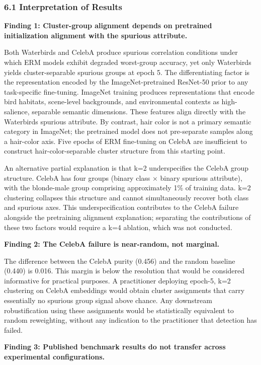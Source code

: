 
\subsubsection{6.1 Interpretation of Results}

\textbf{Finding 1: Cluster-group alignment depends on pretrained initialization alignment with the spurious attribute.}

Both Waterbirds and CelebA produce spurious correlation conditions under which ERM models exhibit degraded worst-group accuracy, yet only Waterbirds yields cluster-separable spurious groups at epoch 5. The differentiating factor is the representation encoded by the ImageNet-pretrained ResNet-50 prior to any task-specific fine-tuning. ImageNet training produces representations that encode bird habitats, scene-level backgrounds, and environmental contexts as high-salience, separable semantic dimensions. These features align directly with the Waterbirds spurious attribute. By contrast, hair color is not a primary semantic category in ImageNet; the pretrained model does not pre-separate samples along a hair-color axis. Five epochs of ERM fine-tuning on CelebA are insufficient to construct hair-color-separable cluster structure from this starting point.

An alternative partial explanation is that k=2 underspecifies the CelebA group structure. CelebA has four groups (binary class × binary spurious attribute), with the blonde-male group comprising approximately 1\% of training data. k=2 clustering collapses this structure and cannot simultaneously recover both class and spurious axes. This underspecification contributes to the CelebA failure alongside the pretraining alignment explanation; separating the contributions of these two factors would require a k=4 ablation, which was not conducted.

\textbf{Finding 2: The CelebA failure is near-random, not marginal.}

The difference between the CelebA purity (0.456) and the random baseline (0.440) is 0.016. This margin is below the resolution that would be considered informative for practical purposes. A practitioner deploying epoch-5, k=2 clustering on CelebA embeddings would obtain cluster assignments that carry essentially no spurious group signal above chance. Any downstream robustification using these assignments would be statistically equivalent to random reweighting, without any indication to the practitioner that detection has failed.

\textbf{Finding 3: Published benchmark results do not transfer across experimental configurations.}

